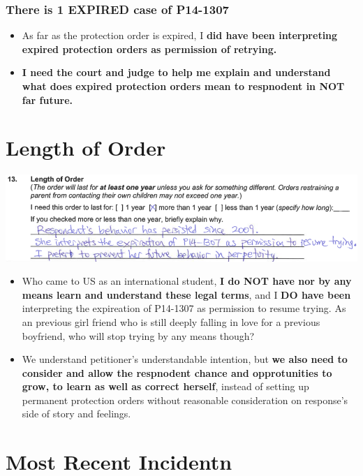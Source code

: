 \documentclass[9pt, b5paper]{article}
\begin{document}
\subsubsection{There is 1 EXPIRED case of \textbf{P14-1307}}
\label{sec-2-1-3}
\begin{itemize}
\item As far as the protection order is expired, I \textbf{did have been interpreting expired protection orders as permission of retrying.}
\item \textbf{I need the court and judge to help me explain and understand what does expired protection orders mean to respnodent in NOT far future.}
\end{itemize}

\section{Length of Order}
\label{sec-3}

\includegraphics[width=.9\linewidth]{./pic/dearCousin_20220919_153711.png}
\begin{itemize}
\item Who came to US as an international student, \textbf{I do NOT have nor by any means learn and understand these legal terms}, and I \textbf{DO have been} interpreting the expireation of P14-1307 as permission to resume trying. As an previous girl friend who is still deeply falling in love for a previous boyfriend, who will stop trying by any means though?
\item We understand petitioner's understandable intention, but \textbf{we also need to consider and allow the respnodent chance and opprotunities to grow, to learn as well as correct herself}, instead of setting up permanent protection orders without reasonable consideration on response's side of story and feelings.
\end{itemize}

\section{Most Recent Incidentn}
\label{sec-4}
\end{document}
